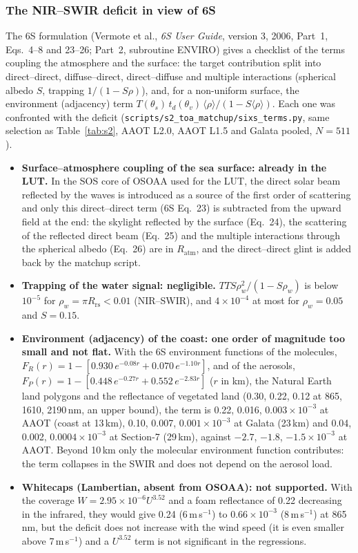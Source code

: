 \documentclass[11pt,a4paper]{article}
\newcommand{\Rrs}{R_\mathrm{rs}}
\newcommand{\code}[1]{\texttt{#1}}
\begin{document}
\subsubsection{The NIR--SWIR deficit in view of 6S}
\label{sec:sixs}
The 6S formulation (Vermote et al., \emph{6S User Guide}, version 3, 2006, Part~1, Eqs.~4--8 and 23--26; Part~2,
subroutine ENVIRO) gives a checklist of the terms coupling the atmosphere and the surface: the target contribution
split into direct--direct, diffuse--direct, direct--diffuse and multiple interactions (spherical albedo $S$,
trapping $1/(1-S\rho)$), and, for a non-uniform surface, the environment (adjacency) term
$T(\theta_s)\,t_d(\theta_v)\,\langle\rho\rangle/(1-S\langle\rho\rangle)$. Each one was confronted with the deficit
(\code{scripts/s2\_toa\_matchup/sixs\_terms.py}, same selection as Table~\ref{tab:s2}, AAOT L2.0, AAOT L1.5 and
Galata pooled, $N=511$).

\begin{itemize}
\item \textbf{Surface--atmosphere coupling of the sea surface: already in the LUT.} In the SOS core of OSOAA used for
  the LUT, the direct solar beam reflected by the waves is introduced as a source of the first order of scattering
  and only this direct--direct term (6S Eq.~23) is subtracted from the upward field at the end: the skylight
  reflected by the surface (Eq.~24), the scattering of the reflected direct beam (Eq.~25) and the multiple
  interactions through the spherical albedo (Eq.~26) are in $R_\mathrm{atm}$, and the direct--direct glint is
  added back by the matchup script.
\item \textbf{Trapping of the water signal: negligible.} $T T S\rho_w^2/(1-S\rho_w)$ is below $10^{-5}$ for
  $\rho_w = \pi\Rrs < 0.01$ (NIR--SWIR), and $4\times10^{-4}$ at most for $\rho_w = 0.05$ and $S=0.15$.
\item \textbf{Environment (adjacency) of the coast: one order of magnitude too small and not flat.} With the 6S
  environment functions of the molecules, $F_R(r) = 1-[0.930\,e^{-0.08r}+0.070\,e^{-1.10r}]$, and of the aerosols,
  $F_P(r) = 1-[0.448\,e^{-0.27r}+0.552\,e^{-2.83r}]$ ($r$ in km), the Natural Earth land polygons and the
  reflectance of vegetated land (0.30, 0.22, 0.12 at 865, 1610, 2190\,nm, an upper bound), the term is
  0.22, 0.016, $0.003\times10^{-3}$ at AAOT (coast at 13\,km), 0.10, 0.007, $0.001\times10^{-3}$ at Galata (23\,km)
  and 0.04, 0.002, $0.0004\times10^{-3}$ at Section-7 (29\,km), against $-2.7$, $-1.8$, $-1.5\times10^{-3}$ at
  AAOT. Beyond 10\,km only the molecular environment function contributes: the term collapses in the SWIR and does
  not depend on the aerosol load.
\item \textbf{Whitecaps (Lambertian, absent from OSOAA): not supported.} With the coverage
  $W = 2.95\times10^{-6}U^{3.52}$ and a foam reflectance of 0.22 decreasing in the infrared, they would give
  0.24 (6\,m\,s$^{-1}$) to $0.66\times10^{-3}$ (8\,m\,s$^{-1}$) at 865\,nm, but the deficit does not increase with
  the wind speed (it is even smaller above 7\,m\,s$^{-1}$) and a $U^{3.52}$ term is not significant in the
  regressions.
\end{itemize}
\end{document}
